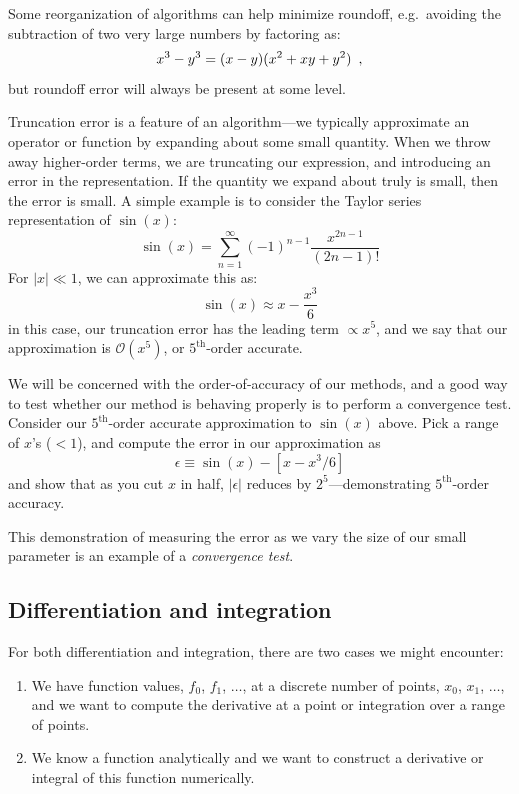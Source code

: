 Some reorganization of algorithms can help minimize roundoff,
e.g.\ avoiding the subtraction of two very large numbers by factoring as:
\begin{equation}
x^3 - y^3 = (x - y)(x^2 + xy + y^2) \enskip ,
\end{equation}
but roundoff error will always be present at some level.

Truncation error is a feature of an algorithm---we typically
approximate an operator or function by expanding about some small
quantity.  When we throw away higher-order terms, we are truncating
our expression, and introducing an error in the representation.  If
the quantity we expand about truly is small, then the error is small.
A simple example is to consider the Taylor series representation of
$\sin(x)$:
\begin{equation}
\sin(x) = \sum_{n=1}^\infty (-1)^{n-1} \frac{x^{2n-1}}{(2n-1)!}
\end{equation}
For $|x| \ll 1$, we can approximate this as:
\begin{equation}
\sin(x) \approx x - \frac{x^3}{6}
\end{equation}
in this case, our truncation error has the leading term $\propto x^5$,
and we say that our approximation is $\mathcal{O}(x^5)$, or
$5^\mathrm{th}$-order accurate.

\begin{exercise}
We will be concerned with the order-of-accuracy of our methods, and a
good way to test whether our method is behaving properly is to perform
a convergence test.  Consider our $5^\mathrm{th}$-order accurate
approximation to $\sin(x)$ above.  Pick a range of $x$'s ($< 1$), and
compute the error in our approximation as
\begin{equation*}
\epsilon \equiv \sin(x) - [  x - x^3/6 ]
\end{equation*}
and show that as you cut $x$ in half, $|\epsilon|$
reduces by $2^5$---demonstrating $5^\mathrm{th}$-order accuracy.
\end{exercise}

This demonstration of measuring the error as we vary the size
of our small parameter is an example of a {\em convergence test}.

\subsection{Differentiation and integration}

For both differentiation and integration, there are two cases we might
encounter:
\begin{enumerate}
\item We have function values, $f_0$, $f_1$, $\ldots$, at a discrete
  number of points, $x_0$, $x_1$, $\ldots$, and we want to compute the
  derivative at a point or integration over a range of points.
\item We know a function analytically and we want to construct a
  derivative or integral of this function numerically. 
\end{enumerate}

